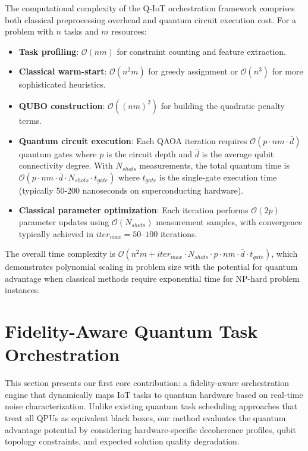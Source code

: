 \documentclass[lettersize,journal]{IEEEtran}
\begin{document}
The computational complexity of the Q-IoT orchestration framework comprises both classical preprocessing overhead and quantum circuit execution cost. For a problem with $n$ tasks and $m$ resources:

\begin{itemize}
    \item \textbf{Task profiling}: $\mathcal{O}(nm)$ for constraint counting and feature extraction.
    
    \item \textbf{Classical warm-start}: $\mathcal{O}(n^2 m)$ for greedy assignment or $\mathcal{O}(n^3)$ for more sophisticated heuristics.
    
    \item \textbf{QUBO construction}: $\mathcal{O}((nm)^2)$ for building the quadratic penalty terms.
    
    \item \textbf{Quantum circuit execution}: Each QAOA iteration requires $\mathcal{O}(p \cdot nm \cdot \bar{d})$ quantum gates where $p$ is the circuit depth and $\bar{d}$ is the average qubit connectivity degree. With $N_{shots}$ measurements, the total quantum time is $\mathcal{O}(p \cdot nm \cdot \bar{d} \cdot N_{shots} \cdot t_{gate})$ where $t_{gate}$ is the single-gate execution time (typically 50-200 nanoseconds on superconducting hardware).
    
    \item \textbf{Classical parameter optimization}: Each iteration performs $\mathcal{O}(2p)$ parameter updates using $\mathcal{O}(N_{shots})$ measurement samples, with convergence typically achieved in $iter_{max} = 50$--$100$ iterations.
\end{itemize}

The overall time complexity is $\mathcal{O}(n^2 m + iter_{max} \cdot N_{shots} \cdot p \cdot nm \cdot \bar{d} \cdot t_{gate})$, which demonstrates polynomial scaling in problem size with the potential for quantum advantage when classical methods require exponential time for NP-hard problem instances.

\section{Fidelity-Aware Quantum Task Orchestration}
\label{sec:fidelity_aware}

This section presents our first core contribution: a fidelity-aware orchestration engine that dynamically maps IoT tasks to quantum hardware based on real-time noise characterization. Unlike existing quantum task scheduling approaches that treat all QPUs as equivalent black boxes, our method evaluates the quantum advantage potential by considering hardware-specific decoherence profiles, qubit topology constraints, and expected solution quality degradation.
\end{document}
